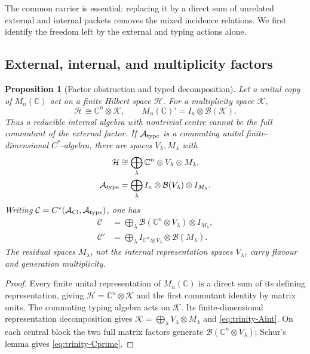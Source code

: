 \documentclass[11pt]{article}
\numberwithin{equation}{section}
\newtheorem{proposition}[theorem]{Proposition}
\theoremstyle{definition}
\theoremstyle{remark}
\newcommand{\C}{\mathbb C}
\newcommand{\A}{\mathcal A}
\newcommand{\Hh}{\mathcal H}
\begin{document}
The common carrier is essential: replacing it by a direct sum of unrelated
external and internal packets removes the mixed incidence relations.  We first
identify the freedom left by the external and typing actions alone.


\subsection{External, internal, and multiplicity factors}
\label{sec:obstruction}

\begin{proposition}[Factor obstruction and typed decomposition]
\label{thm:trinity}
Let a unital copy of $M_n(\C)$ act on a finite Hilbert space $\Hh$.
For a multiplicity space $\mathcal K$,
\begin{equation}
 \Hh\cong\C^n\otimes\mathcal K,\qquad
 M_n(\C)'=I_n\otimes\mathcal B(\mathcal K).
 \label{eq:factor-commutant}
\end{equation}
Thus a reducible internal algebra with nontrivial centre cannot be the full
commutant of the external factor.  If $\A_{\rm type}$ is a commuting unital
finite-dimensional $C^*$-algebra, there are spaces $V_\lambda,M_\lambda$ with
\begin{align}
 \Hh&\cong\bigoplus_\lambda\C^n\otimes V_\lambda\otimes M_\lambda,
 \label{eq:trinity-H}\\
 \A_{\rm type}&=\bigoplus_\lambda I_n\otimes\mathcal B(V_\lambda)
                         \otimes I_{M_\lambda}.
 \label{eq:trinity-Aint}
\end{align}
Writing $\mathcal C=C^*(\A_{\rm Cl},\A_{\rm type})$, one has
\begin{align}
 \mathcal C&=\bigoplus_\lambda\mathcal B(\C^n\otimes V_\lambda)
                         \otimes I_{M_\lambda},\label{eq:trinity-C}\\
 \mathcal C'&=\bigoplus_\lambda I_{\C^n\otimes V_\lambda}
                         \otimes\mathcal B(M_\lambda).
 \label{eq:trinity-Cprime}
\end{align}
The residual spaces $M_\lambda$, not the internal representation spaces
$V_\lambda$, carry flavour and generation multiplicity.
\end{proposition}
\begin{proof}
Every finite unital representation of $M_n(\C)$ is a direct sum of its
defining representation, giving $\Hh=\C^n\otimes\mathcal K$ and the first
commutant identity by matrix units.  The commuting typing algebra acts on
$\mathcal K$.  Its finite-dimensional representation decomposition gives
$\mathcal K=\bigoplus_\lambda V_\lambda\otimes M_\lambda$ and
\eqref{eq:trinity-Aint}.  On each central block the two full matrix factors
generate $\mathcal B(\C^n\otimes V_\lambda)$; Schur's lemma gives
\eqref{eq:trinity-Cprime}.
\end{proof}
\end{document}

